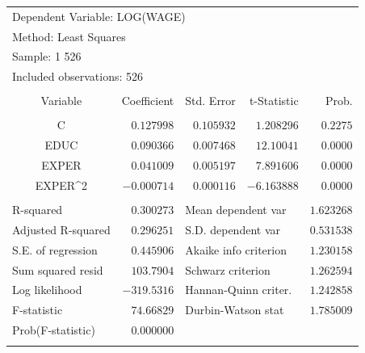 \documentclass[12pt]{report}
\begin{document}
\begin{table}[H]
	\centering
	\begin{tabular}{lrrrr}
		\multicolumn{4}{l}{Dependent Variable: LOG(WAGE)}&\multicolumn{1}{c}{}\\
		\multicolumn{3}{l}{Method: Least Squares}&\multicolumn{1}{c}{}&\multicolumn{1}{c}{}\\
		\multicolumn{2}{l}{Sample: 1 526}&\multicolumn{1}{c}{}&\multicolumn{1}{c}{}&\multicolumn{1}{c}{}\\
		\multicolumn{3}{l}{Included observations: 526}&\multicolumn{1}{c}{}&\multicolumn{1}{c}{}\\
		[4.5pt] \hline \\ [-4.5pt]
		\multicolumn{1}{c}{Variable}&\multicolumn{1}{r}{Coefficient}&\multicolumn{1}{r}{Std. Error}&\multicolumn{1}{r}{t-Statistic}&\multicolumn{1}{r}{Prob.}\\
		[4.5pt] \hline \\ [-4.5pt]
		\multicolumn{1}{c}{C}&\multicolumn{1}{r}{$0.127998$}&\multicolumn{1}{r}{$0.105932$}&\multicolumn{1}{r}{$1.208296$}&\multicolumn{1}{r}{$0.2275$}\\
		\multicolumn{1}{c}{EDUC}&\multicolumn{1}{r}{$0.090366$}&\multicolumn{1}{r}{$0.007468$}&\multicolumn{1}{r}{$12.10041$}&\multicolumn{1}{r}{$0.0000$}\\
		\multicolumn{1}{c}{EXPER}&\multicolumn{1}{r}{$0.041009$}&\multicolumn{1}{r}{$0.005197$}&\multicolumn{1}{r}{$7.891606$}&\multicolumn{1}{r}{$0.0000$}\\
		\multicolumn{1}{c}{EXPER\textasciicircum 2}&\multicolumn{1}{r}{$-0.000714$}&\multicolumn{1}{r}{$0.000116$}&\multicolumn{1}{r}{$-6.163888$}&\multicolumn{1}{r}{$0.0000$}\\
		[4.5pt] \hline \\ [-4.5pt]
		\multicolumn{1}{l}{R-squared}&\multicolumn{1}{r}{$0.300273$}&\multicolumn{2}{l}{Mean dependent var}&\multicolumn{1}{r}{$1.623268$}\\
		\multicolumn{1}{l}{Adjusted R-squared}&\multicolumn{1}{r}{$0.296251$}&\multicolumn{2}{l}{S.D. dependent var}&\multicolumn{1}{r}{$0.531538$}\\
		\multicolumn{1}{l}{S.E. of regression}&\multicolumn{1}{r}{$0.445906$}&\multicolumn{2}{l}{Akaike info criterion}&\multicolumn{1}{r}{$1.230158$}\\
		\multicolumn{1}{l}{Sum squared resid}&\multicolumn{1}{r}{$103.7904$}&\multicolumn{2}{l}{Schwarz criterion}&\multicolumn{1}{r}{$1.262594$}\\
		\multicolumn{1}{l}{Log likelihood}&\multicolumn{1}{r}{$-319.5316$}&\multicolumn{2}{l}{Hannan-Quinn criter.}&\multicolumn{1}{r}{$1.242858$}\\
		\multicolumn{1}{l}{F-statistic}&\multicolumn{1}{r}{$74.66829$}&\multicolumn{2}{l}{Durbin-Watson stat}&\multicolumn{1}{r}{$1.785009$}\\
		\multicolumn{1}{l}{Prob(F-statistic)}&\multicolumn{1}{r}{$0.000000$}&\multicolumn{1}{c}{}&\multicolumn{1}{c}{}&\multicolumn{1}{c}{}\\
		[4.5pt] \hline \\ [-4.5pt]
	\end{tabular}
\end{table}
\end{document}
